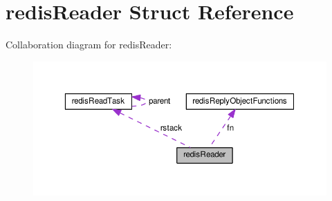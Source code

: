 \hypertarget{structredis_reader}{\section{redis\+Reader Struct Reference}
\label{structredis_reader}
}


Collaboration diagram for redis\+Reader\+:\nopagebreak
\begin{figure}[H]
\begin{center}
\leavevmode
\includegraphics[width=350pt]{structredis_reader__coll__graph}
\end{center}
\end{figure}
